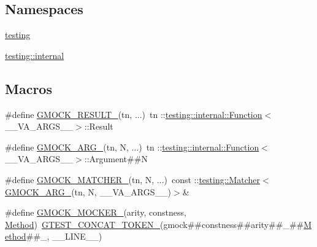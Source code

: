 \subsection*{Namespaces}
\begin{DoxyCompactItemize}
\item 
 \mbox{\hyperlink{namespacetesting}{testing}}
\item 
 \mbox{\hyperlink{namespacetesting_1_1internal}{testing\+::internal}}
\end{DoxyCompactItemize}
\subsection*{Macros}
\begin{DoxyCompactItemize}
\item 
\#define \mbox{\hyperlink{_obj__test_2lib_2googletest-release-1_88_81_2googlemock_2include_2gmock_2gmock-generated-function-mockers_8h_a0e9d94e9c77df84f1103af06feee1077}{G\+M\+O\+C\+K\+\_\+\+R\+E\+S\+U\+L\+T\+\_\+}}(tn, ...)~tn \+::\mbox{\hyperlink{structtesting_1_1internal_1_1_function}{testing\+::internal\+::\+Function}}$<$\+\_\+\+\_\+\+V\+A\+\_\+\+A\+R\+G\+S\+\_\+\+\_\+$>$\+::Result
\item 
\#define \mbox{\hyperlink{_obj__test_2lib_2googletest-release-1_88_81_2googlemock_2include_2gmock_2gmock-generated-function-mockers_8h_a887575cc1c31158fba808180a10c004f}{G\+M\+O\+C\+K\+\_\+\+A\+R\+G\+\_\+}}(tn,  N, ...)~tn \+::\mbox{\hyperlink{structtesting_1_1internal_1_1_function}{testing\+::internal\+::\+Function}}$<$\+\_\+\+\_\+\+V\+A\+\_\+\+A\+R\+G\+S\+\_\+\+\_\+$>$\+::Argument\#\#N
\item 
\#define \mbox{\hyperlink{_obj__test_2lib_2googletest-release-1_88_81_2googlemock_2include_2gmock_2gmock-generated-function-mockers_8h_aa87d0009fe91f1c89d658776b55a769c}{G\+M\+O\+C\+K\+\_\+\+M\+A\+T\+C\+H\+E\+R\+\_\+}}(tn,  N, ...)~const \+::\mbox{\hyperlink{classtesting_1_1_matcher}{testing\+::\+Matcher}}$<$\mbox{\hyperlink{_obj__test_2lib_2googletest-release-1_88_81_2googlemock_2include_2gmock_2gmock-generated-function-mockers_8h_a887575cc1c31158fba808180a10c004f}{G\+M\+O\+C\+K\+\_\+\+A\+R\+G\+\_\+}}(tn, N, \+\_\+\+\_\+\+V\+A\+\_\+\+A\+R\+G\+S\+\_\+\+\_\+)$>$\&
\item 
\#define \mbox{\hyperlink{_obj__test_2lib_2googletest-release-1_88_81_2googlemock_2include_2gmock_2gmock-generated-function-mockers_8h_a7d362499e27b1bc3a9806dd3cf58a5b7}{G\+M\+O\+C\+K\+\_\+\+M\+O\+C\+K\+E\+R\+\_\+}}(arity,  constness,  \mbox{\hyperlink{_obj__test_2lib_2googletest-release-1_88_81_2googlemock_2test_2gmock-spec-builders__test_8cc_a95606368148f3e5aab5db46c32466afd}{Method}})~\mbox{\hyperlink{_obj__test_2lib_2googletest-release-1_88_81_2googletest_2include_2gtest_2internal_2gtest-internal_8h_ae3c336cbe1ae2bd1b1d019333e4428a0}{G\+T\+E\+S\+T\+\_\+\+C\+O\+N\+C\+A\+T\+\_\+\+T\+O\+K\+E\+N\+\_\+}}(gmock\#\#constness\#\#arity\#\#\+\_\+\#\#\mbox{\hyperlink{_obj__test_2lib_2googletest-release-1_88_81_2googlemock_2test_2gmock-spec-builders__test_8cc_a95606368148f3e5aab5db46c32466afd}{Method}}\#\#\+\_\+, \+\_\+\+\_\+\+L\+I\+N\+E\+\_\+\+\_\+)

\end{DoxyCompactItemize}
